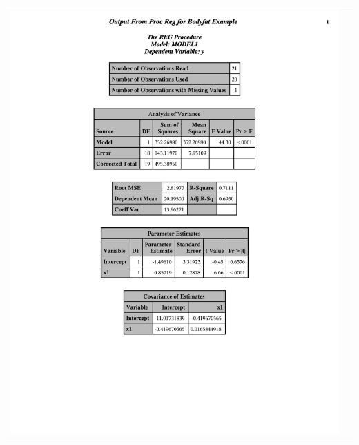 \documentclass{article}
\begin{document}
\begin{center}
\begin{tabular}{cc}
\includegraphics[page=2,scale=0.5,trim=40mm 30mm 20mm 10mm]{bodyfatexample}\\
\end{tabular}
\begin{tabular}{cc}

\end{tabular}
\end{center}
\end{document}
